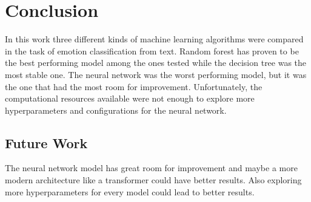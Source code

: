\section{Conclusion}
\label{sec:conclusion}

In this work three different kinds of
machine learning algorithms were compared
in the task of emotion classification from
text. Random forest has proven to be the best
performing model among the ones tested while
the decision tree was the most stable one.
The neural network was the worst performing
model, but it was the one that had the most
room for improvement. Unfortunately, the 
computational resources available
were not enough to explore more hyperparameters
and configurations for the neural network.

\subsection{Future Work}
\label{sec:future_work}

The neural network model has great room for
improvement and maybe a more modern 
architecture like a transformer could have
better results. Also exploring more
hyperparameters for every model could
lead to better results.